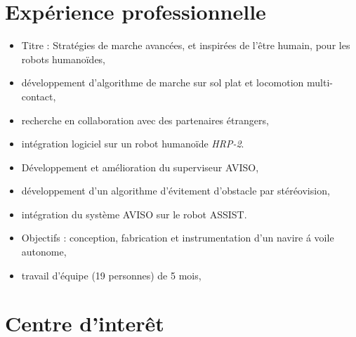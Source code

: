 \documentclass[11pt,a4paper]{moderncv}
\begin{document}
\section{Exp\'erience professionnelle}
{
\begin{itemize}%
\item Titre : Strat\'egies de marche avanc\'ees, et inspir\'ees de l'\^etre humain, pour les robots humano\"ides,
\item d\'eveloppement d'algorithme de marche sur sol plat et locomotion multi-contact,
\item recherche en collaboration avec des partenaires \'etrangers,
\item int\'egration logiciel sur un robot humano\"ide \emph{HRP-2}.
\newline{}
\end{itemize}
}
%
%
{
\begin{itemize}%
\item D\'eveloppement et am\'elioration du superviseur AVISO,
\item d\'eveloppement d'un algorithme d'\'evitement d'obstacle par st\'er\'eovision,
\item int\'egration du syst\`eme AVISO sur le robot ASSIST.
\newline{}
\end{itemize}
}
%
%
{
\begin{itemize}%
\item Objectifs : conception, fabrication et instrumentation d'un navire \'a voile autonome,
\item travail d'\'equipe (19 personnes) de 5 mois,
\newline{}
\end{itemize}
}
%
%
%

\section{Centre d'inter\^et}

\end{document}

